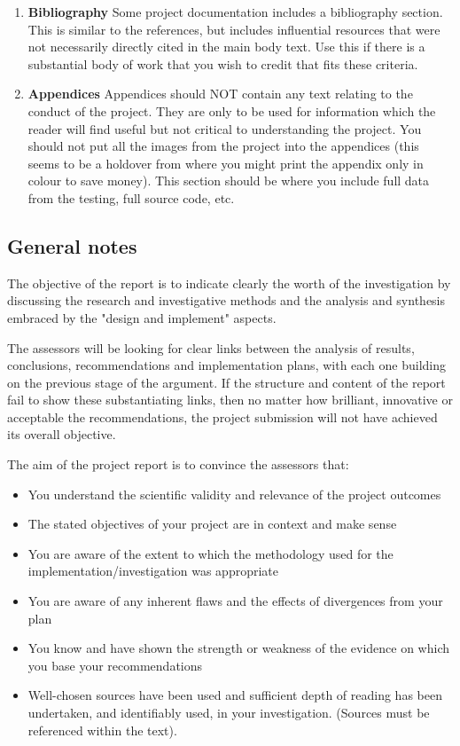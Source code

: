 \begin{enumerate}
    \item \textbf{Bibliography}
    \subitem Some project documentation includes a bibliography section. This is similar to the references, but includes influential resources that were not necessarily directly cited in the main body text. Use this if there is a substantial body of work that you wish to credit that fits these criteria. 
    
    \item \textbf{Appendices}
    \subitem Appendices should NOT contain any text relating to the conduct of the project. They are only to be used for information which the reader will find useful but not critical to understanding the project. You should not put all the images from the project into the appendices (this seems to be a holdover from where you might print the appendix only in colour to save money). This section should be where you include full data from the testing, full source code, etc. 
\end{enumerate}


\subsection{General notes}

The objective of the report is to indicate clearly the worth of the investigation by discussing the research and investigative methods and the analysis and synthesis embraced by the "design and implement" aspects.

The assessors will be looking for clear links between the analysis of results, conclusions, recommendations and implementation plans, with each one building on the previous stage of the argument. If the structure and content of the report fail to show these substantiating links, then no matter how brilliant, innovative or acceptable the recommendations, the project submission will not have achieved its overall objective.

The aim of the project report is to convince the assessors that:

\begin{itemize}
    \item You understand the scientific validity and relevance of the project outcomes
    \item The stated objectives of your project are in context and make sense
    \item You are aware of the extent to which the methodology used for the implementation/investigation was appropriate
    \item You are aware of any inherent flaws and the effects of divergences from your plan
    \item You know and have shown the strength or weakness of the evidence on which you base your recommendations
    \item Well-chosen sources have been used and sufficient depth of reading has been
    undertaken, and identifiably used, in your investigation. (Sources must be referenced
    within the text).
\end{itemize}

